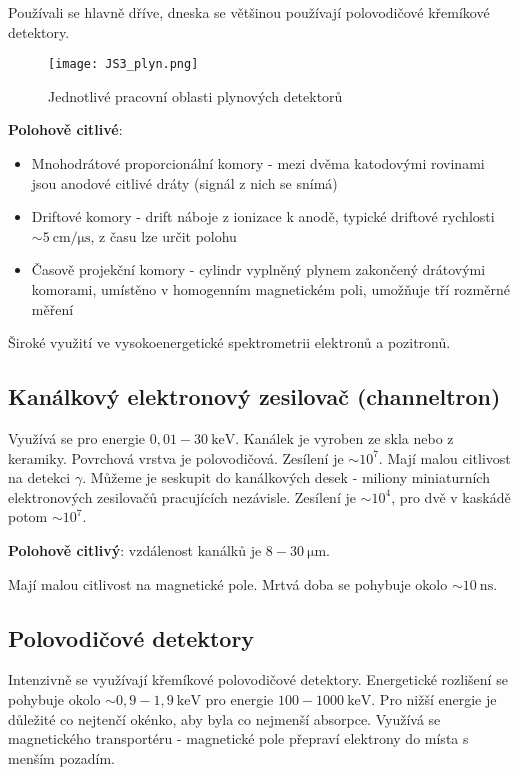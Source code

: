 \documentclass[../../main.tex]{subfiles}
\begin{document}
Používali se hlavně dříve, dneska se většinou používají polovodičové křemíkové detektory.

\begin{figure}[h]
	\centering	
	\texttt{[image: JS3\_plyn.png]}
	\caption{Jednotlivé pracovní oblasti plynových detektorů}		
\end{figure}

\textbf{Polohově citlivé}:
\begin{itemize}
	\item Mnohodrátové proporcionální komory - mezi dvěma katodovými rovinami jsou anodové citlivé dráty (signál z nich se snímá)
	\item Driftové komory - drift náboje z ionizace k anodě, typické driftové rychlosti $\sim 5 ~\mathrm{cm/\mu s}$, z času lze určit polohu
	\item Časově projekční komory - cylindr vyplněný plynem zakončený drátovými komorami, umístěno v homogenním magnetickém poli, umožňuje tří rozměrné měření
\end{itemize}

Široké využití ve vysokoenergetické spektrometrii elektronů a pozitronů. 

\subsection{Kanálkový elektronový zesilovač (channeltron)}	

Využívá se pro energie $0,01 - 30 ~\mathrm{keV}$. Kanálek je vyroben ze skla nebo z keramiky. Povrchová vrstva je polovodičová. Zesílení je $\sim 10^7$. Mají malou citlivost na detekci $\gamma$. Můžeme je seskupit do kanálkových desek - miliony miniaturních elektronových zesilovačů pracujících nezávisle. Zesílení je $\sim 10^4$, pro dvě v kaskádě potom $\sim 10^7$. 

\textbf{Polohově citlivý}: vzdálenost kanálků je $8 - 30 ~\mathrm{\mu m}$. 

Mají malou citlivost na magnetické pole. Mrtvá doba se pohybuje okolo $\sim 10 ~\mathrm{ns}$. 
	
\subsection{Polovodičové detektory}

Intenzivně se využívají křemíkové polovodičové detektory. Energetické rozlišení se pohybuje okolo $\sim 0,9 - 1,9 ~\mathrm{keV}$ pro energie $100 - 1000 ~\mathrm{keV}$. Pro nižší energie je důležité co nejtenčí okénko, aby byla co nejmenší absorpce. Využívá se magnetického transportéru - magnetické pole přepraví elektrony do místa s menším pozadím. 
\end{document}
